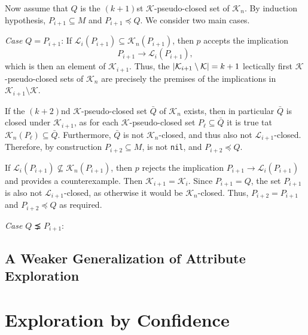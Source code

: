 \begin{Proof}
  Now assume that $Q$ is the $(k+1)$st $\mathcal{K}$-pseudo-closed set of
  $\mathcal{K}_{n}$.  By induction hypothesis, $P_{i+1} \subseteq M$ and $P_{i+1} \preceq
  Q$.  We consider two main cases.

  \textit{Case $Q = P_{i+1}$}:  If $\mathcal{L}_{i}(P_{i+1}) \subseteq
  \mathcal{K}_{n}(P_{i+1})$, then $p$ accepts the implication
  \begin{equation*}
    P_{i+1} \to \mathcal{L}_{i}(P_{i+1}),
  \end{equation*}
  which is then an element of $\mathcal{K}_{i+1}$.  Thus, the $\lvert \mathcal{K}_{i+1}
    \setminus \mathcal{K} \rvert = k + 1$ lectically first $\mathcal{K}$-pseudo-closed sets of
  $\mathcal{K}_{n}$ are precisely the premises of the implications in $\mathcal{K}_{i+1}
  \setminus \mathcal{K}$.

  If the $(k+2)$nd $\mathcal{K}$-pseudo-closed set $\bar Q$ of $\mathcal{K}_{n}$ exists,
  then in particular $\bar Q$ is closed under $\mathcal{K}_{i+1}$, as for each
  $\mathcal{K}$-pseudo-closed set $P_{\ell} \subseteq \bar Q$ it is true tat
  $\mathcal{K}_{n}(P_{\ell}) \subseteq \bar Q$.  Furthermore, $\bar Q$ is not
  $\mathcal{K}_{n}$-closed, and thus also not $\mathcal{L}_{i+1}$-closed.  Therefore, by
  construction $P_{i+2} \subseteq M$, \ie is not \lstinline{nil}, and $P_{i+2} \preceq Q$.

  If $\mathcal{L}_{i}(P_{i+1}) \not\subseteq \mathcal{K}_{n}(P_{i+1})$, then $p$ rejects
  the implication $P_{i+1} \to \mathcal{L}_{i}(P_{i+1})$ and provides a counterexample.
  Then $\mathcal{K}_{i+1} = \mathcal{K}_{i}$.  Since $P_{i+1} = Q$, the set $P_{i+1}$ is
  also not $\mathcal{L}_{i+1}$-closed, as otherwise it would be $\mathcal{K}_{n}$-closed.
  Thus, $P_{i+2} = P_{i+1}$ and $P_{i+2} \preceq Q$ as required.

  \textit{Case $Q \precneq P_{i+1}$}:
\end{Proof}

%

\subsection{A Weaker Generalization of Attribute Exploration}
\label{sec:weak-gener-attr}


\section{Exploration by Confidence}
\label{sec:expl-conf}

